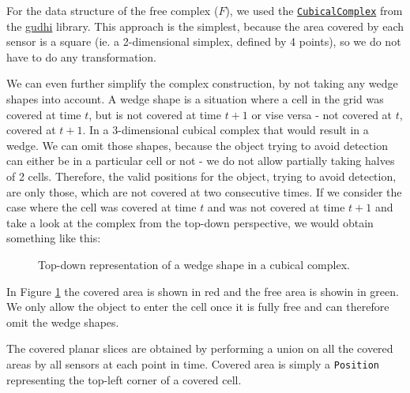 \documentclass{article}
\begin{document}
For the data structure of the free complex ($F$), we used the \href{https://gudhi.inria.fr/python/latest/cubical_complex_user.html}{\texttt{CubicalComplex}} from the \href{https://pypi.org/project/gudhi/}{gudhi} library.
This approach is the simplest, because the area covered by each sensor is a square (ie. a 2-dimensional simplex, defined by 4 points), so we do not have to do any transformation.

We can even further simplify the complex construction, by not taking any wedge shapes into account.
A wedge shape is a situation where a cell in the grid was covered at time $t$, but is not covered at time $t + 1$ or vise versa - not covered at $t$, covered at $t + 1$.
In a 3-dimensional cubical complex that would result in a wedge.
We can omit those shapes, because the object trying to avoid detection can either be in a particular cell or not - we do not allow partially taking halves of 2 cells.
Therefore, the valid positions for the object, trying to avoid detection, are only those, which are not covered at two consecutive times.
If we consider the case where the cell was covered at time $t$ and was not covered at time $t + 1$ and take a look at the complex from the top-down perspective, we would obtain something like this:

\smallskip

\begin{figure}[H]
  \centering


  \caption{Top-down representation of a wedge shape in a cubical complex.}
  \label{fig:wedge}
\end{figure}

In Figure \ref{fig:wedge} the covered area is shown in red and the free area is showin in green.
We only allow the object to enter the cell once it is fully free and can therefore omit the wedge shapes.

The covered planar slices are obtained by performing a union on all the covered areas by all sensors at each point in time.
Covered area is simply a \texttt{Position} representing the top-left corner of a covered cell.
\end{document}
